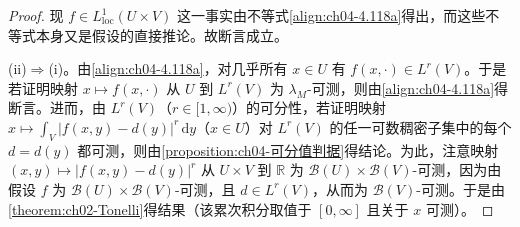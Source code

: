 \documentclass[../../main.tex]{subfiles}%
\begin{document}
\begin{proof}
现 $f\in L^1_{\mathrm{loc}}(U\times V)$ 这一事实由不等式\eqref{align:ch04-4.118a}得出，而这些不等式本身又是假设的直接推论。故断言成立。

(ii)$\Rightarrow$(i)。由\eqref{align:ch04-4.118a}，对几乎所有 $x\in U$ 有 $f(x,\cdot)\in L^r(V)$。于是若证明映射 $x\mapsto f(x,\cdot)$ 从 $U$ 到 $L^r(V)$ 为 $\lambda_M$-可测，则由\eqref{align:ch04-4.118a}得断言。进而，由 $L^r(V)$（$r\in[1,\infty)$）的可分性，若证明映射 $x\mapsto\int_V|f(x,y)-d(y)|^r\,\mathrm{d}y$（$x\in U$）对 $L^r(V)$ 的任一可数稠密子集中的每个 $d=d(y)$ 都可测，则由\cref{proposition:ch04-可分值判据}得结论。为此，注意映射 $(x,y)\mapsto|f(x,y)-d(y)|^r$ 从 $U\times V$ 到 $\mathbb{R}$ 为 $\mathcal{B}(U)\times\mathcal{B}(V)$-可测，因为由假设 $f$ 为 $\mathcal{B}(U)\times\mathcal{B}(V)$-可测，且 $d\in L^r(V)$，从而为 $\mathcal{B}(V)$-可测。于是由\cref{theorem:ch02-Tonelli}得结果（该累次积分取值于 $[0,\infty]$ 且关于 $x$ 可测）。
\end{proof}
\end{document}
